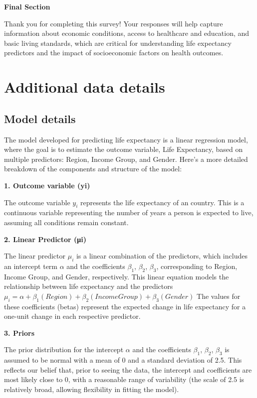 \documentclass[
  letterpaper,
  DIV=11,
  numbers=noendperiod]{scrartcl}
\begin{document}
\textbf{Final Section}

Thank you for completing this survey! Your responses will help capture
information about economic conditions, access to healthcare and
education, and basic living standards, which are critical for
understanding life expectancy predictors and the impact of socioeconomic
factors on health outcomes.

\section{Additional data details}\label{additional-data-details}

\subsection{Model details}\label{sec-model-details}

The model developed for predicting life expectancy is a linear
regression model, where the goal is to estimate the outcome variable,
Life Expectancy, based on multiple predictors: Region, Income Group, and
Gender. Here's a more detailed breakdown of the components and structure
of the model:

\textbf{1. Outcome variable (yi)}

The outcome variable \(y_i\) represents the life expectancy of an
country. This is a continuous variable representing the number of years
a person is expected to live, assuming all conditions remain constant.

\textbf{2. Linear Predictor (μi)}

The linear predictor \(μ_i\) is a linear combination of the predictors,
which includes an intercept term \(α\) and the coefficients \(β_1\),
\(β_2\), \(β_3\), corresponding to Region, Income Group, and Gender,
respectively. This linear equation models the relationship between life
expectancy and the predictors
\(\mu_i = \alpha + \beta_1(Region) + \beta_2(Income Group) + \beta_3 (Gender)\)
The values for these coefficients (betas) represent the expected change
in life expectancy for a one-unit change in each respective predictor.

\textbf{3. Priors}

The prior distribution for the intercept \(α\) and the coefficients
\(β_1\), \(β_2\), \(β_3\) is assumed to be normal with a mean of 0 and a
standard deviation of 2.5. This reflects our belief that, prior to
seeing the data, the intercept and coefficients are most likely close to
0, with a reasonable range of variability (the scale of 2.5 is
relatively broad, allowing flexibility in fitting the model).
\end{document}
